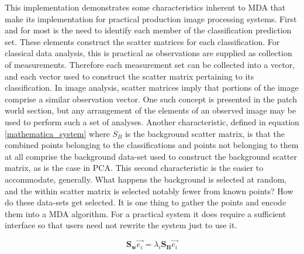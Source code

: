\documentclass[11pt]{article}
\begin{document}
This  implementation demonstrates some characteristics inherent to MDA that make its implementation for practical production image processing systems.  First and for most is the need to identify each member of the classification prediction set.  These elements construct the scatter matrices for each classification.  For classical data analysis, this is practical as observations are supplied as collection of measurements.  Therefore each measurement set can be collected into a vector, and each vector used to construct the scatter matrix pertaining to its classification.  In image analysis, scatter matrices imply that portions of the image comprise a similar observation vector.   One such concept is presented in the patch world section, but any arrangement of the elements of an observed image may be used to perform such a set of analyses.  Another characteristic, defined in equation \ref{mathematica_system} where $S_B$ is the background scatter matrix, is that the combined points belonging to the classifications and points not belonging to them at all comprise the background data-set used to construct the background scatter matrix, as is the case in PCA.  This second characteristic is the easier to accommodate, generally.  What happens the background is selected at random, and the within scatter matrix is selected notably fewer from known points?   How do these data-sets get selected.   It is one thing to gather the points and encode them into a MDA algorithm.   For a practical system it does require a sufficient interface so that users need not rewrite the system just to use it.   


\begin{equation}
\mathbf{S_w} \vec{e_i} = \lambda_i \mathbf{S_B} \vec{e_i} \label{mathematica_system}
\end{equation}
\end{document}

